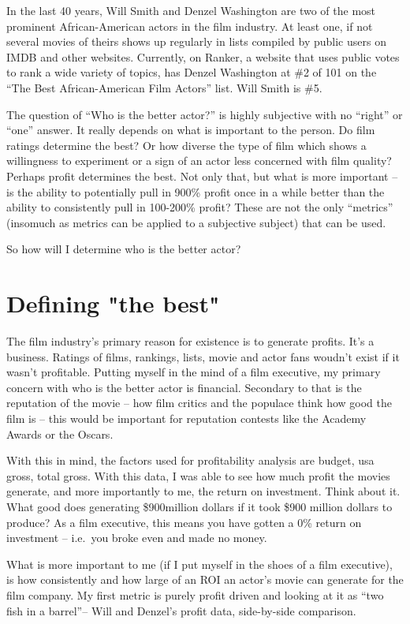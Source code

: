 \documentclass[]{article}
\begin{document}
In the last 40 years, Will Smith and Denzel Washington are two of the
most prominent African-American actors in the film industry. At least
one, if not several movies of theirs shows up regularly in lists
compiled by public users on IMDB and other websites. Currently, on
Ranker, a website that uses public votes to rank a wide variety of
topics, has Denzel Washington at \#2 of 101 on the \enquote{The Best
African-American Film Actors} list. Will Smith is \#5. \citep{Ranker}

The question of \enquote{Who is the better actor?} is highly subjective
with no \enquote{right} or \enquote{one} answer. It really depends on
what is important to the person. Do film ratings determine the best? Or
how diverse the type of film which shows a willingness to experiment or
a sign of an actor less concerned with film quality? Perhaps profit
determines the best. Not only that, but what is more important -- is the
ability to potentially pull in 900\% profit once in a while better than
the ability to consistently pull in 100-200\% profit? These are not the
only \enquote{metrics} (insomuch as metrics can be applied to a
subjective subject) that can be used.

So how will I determine who is the better actor?

\section{Defining "the best"}
\label{sec:rq}

The film industry's primary reason for existence is to generate profits.
It's a business. Ratings of films, rankings, lists, movie and actor fans
woudn't exist if it wasn't profitable. Putting myself in the mind of a
film executive, my primary concern with who is the better actor is
financial. Secondary to that is the reputation of the movie -- how film
critics and the populace think how good the film is -- this would be
important for reputation contests like the Academy Awards or the Oscars.

With this in mind, the factors used for profitability analysis are
budget, usa gross, total gross. With this data, I was able to see how
much profit the movies generate, and more importantly to me, the return
on investment. Think about it. What good does generating \$900million
dollars if it took \$900 million dollars to produce? As a film
executive, this means you have gotten a 0\% return on investment --
i.e.~you broke even and made no money.

What is more important to me (if I put myself in the shoes of a film
executive), is how consistently and how large of an ROI an actor's movie
can generate for the film company. My first metric is purely profit
driven and looking at it as \enquote{two fish in a barrel}-- Will and
Denzel's profit data, side-by-side comparison.
\end{document}
